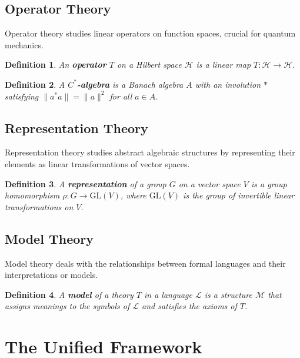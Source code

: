 \documentclass[12pt]{article}
\newtheorem{definition}{Definition}[section]
\newcommand{\GL}{\mathrm{GL}}
\begin{document}
\subsection{Operator Theory}

Operator theory studies linear operators on function spaces, crucial for quantum mechanics.

\begin{definition}
An \textbf{operator} $T$ on a Hilbert space $\mathcal{H}$ is a linear map $T: \mathcal{H} \rightarrow \mathcal{H}$.
\end{definition}

\begin{definition}
A \textbf{$C^*$-algebra} is a Banach algebra $A$ with an involution $*$ satisfying $\|a^* a\| = \|a\|^2$ for all $a \in A$.
\end{definition}

\subsection{Representation Theory}

Representation theory studies abstract algebraic structures by representing their elements as linear transformations of vector spaces.

\begin{definition}
A \textbf{representation} of a group $G$ on a vector space $V$ is a group homomorphism $\rho: G \rightarrow \GL(V)$, where $\GL(V)$ is the group of invertible linear transformations on $V$.
\end{definition}

\subsection{Model Theory}

Model theory deals with the relationships between formal languages and their interpretations or models.

\begin{definition}
A \textbf{model} of a theory $T$ in a language $\mathcal{L}$ is a structure $\mathcal{M}$ that assigns meanings to the symbols of $\mathcal{L}$ and satisfies the axioms of $T$.
\end{definition}

\section{The Unified Framework}
\end{document}
